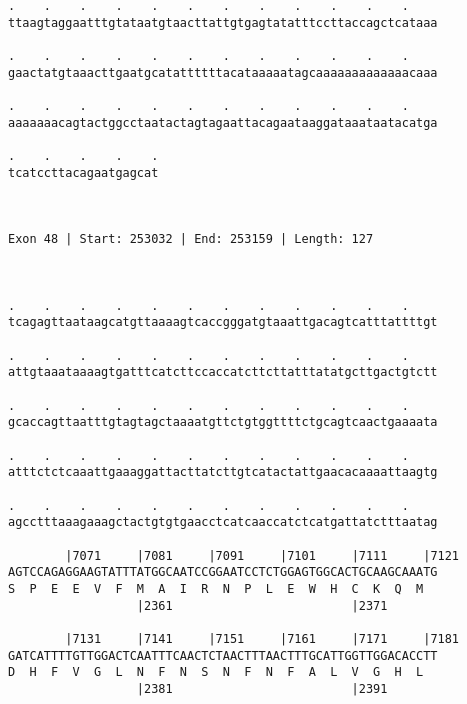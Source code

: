 \documentclass{article}
\begin{document}
\begin{Verbatim}
.    .    .    .    .    .    .    .    .    .    .    .    
ttaagtaggaatttgtataatgtaacttattgtgagtatatttccttaccagctcataaa
                                                            
.    .    .    .    .    .    .    .    .    .    .    .    
gaactatgtaaacttgaatgcatattttttacataaaaatagcaaaaaaaaaaaaacaaa
                                                            
.    .    .    .    .    .    .    .    .    .    .    .    
aaaaaaacagtactggcctaatactagtagaattacagaataaggataaataatacatga
                                                            
.    .    .    .    .
tcatccttacagaatgagcat
                     
                     
 
Exon 48 | Start: 253032 | End: 253159 | Length: 127



.    .    .    .    .    .    .    .    .    .    .    .    
tcagagttaataagcatgttaaaagtcaccgggatgtaaattgacagtcatttattttgt
                                                            
.    .    .    .    .    .    .    .    .    .    .    .    
attgtaaataaaagtgatttcatcttccaccatcttcttatttatatgcttgactgtctt
                                                            
.    .    .    .    .    .    .    .    .    .    .    .    
gcaccagttaatttgtagtagctaaaatgttctgtggttttctgcagtcaactgaaaata
                                                            
.    .    .    .    .    .    .    .    .    .    .    .    
atttctctcaaattgaaaggattacttatcttgtcatactattgaacacaaaattaagtg
                                                            
.    .    .    .    .    .    .    .    .    .    .    .    
agcctttaaagaaagctactgtgtgaacctcatcaaccatctcatgattatctttaatag
                                                            
        |7071     |7081     |7091     |7101     |7111     |7121
AGTCCAGAGGAAGTATTTATGGCAATCCGGAATCCTCTGGAGTGGCACTGCAAGCAAATG
S  P  E  E  V  F  M  A  I  R  N  P  L  E  W  H  C  K  Q  M  
                  |2361                         |2371       
  
        |7131     |7141     |7151     |7161     |7171     |7181
GATCATTTTGTTGGACTCAATTTCAACTCTAACTTTAACTTTGCATTGGTTGGACACCTT
D  H  F  V  G  L  N  F  N  S  N  F  N  F  A  L  V  G  H  L  
                  |2381                         |2391       
  

\end{Verbatim}
\end{document}

